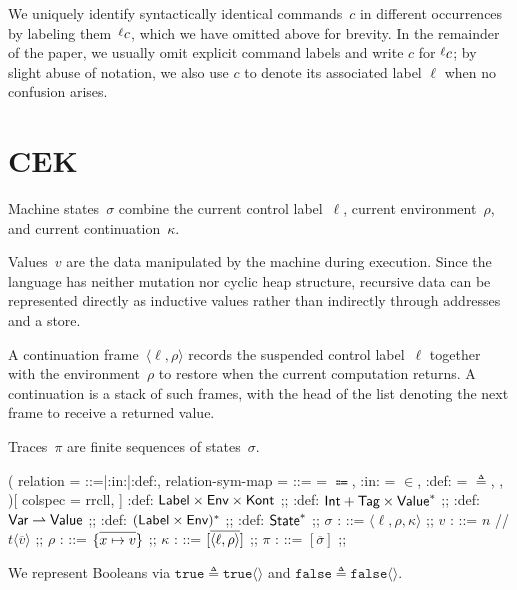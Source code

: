 \documentclass[11pt]{article}
\begin{document}
We uniquely identify syntactically identical commands~$c$ in different occurrences by labeling them~$\lbl{\ell}c$, which we have omitted above for brevity.
In the remainder of the paper, we usually omit explicit command labels and write \(c\) for \(\lbl{\ell}c\); by slight abuse of notation, we also use \(c\) to denote its associated label \(\ell\) when no confusion arises.


\section{CEK}
Machine states~$\sigma$ combine the current control label~$\ell$, current environment~$\rho$, and current continuation~$\kappa.$

Values~$v$ are the data manipulated by the machine during execution.
Since the language has neither mutation nor cyclic heap structure, recursive data can be represented directly as inductive values rather than indirectly through addresses and a store.

A continuation frame~$\langle\ell,\rho\rangle$ records the suspended control label~$\ell$ together with the environment~$\rho$ to restore when the current computation returns.
A continuation is a stack of such frames, with the head of the list denoting the next frame to receive a returned value.

Traces~$\pi$ are finite sequences of states~$\sigma$.
\begin{center}
\begin{bnf}(
  relation = {::=|:in:|:def:},
  relation-sym-map = {
    {::=} = {\ensuremath{\Coloneqq}},
    {:in:} = {\ensuremath{\in}},
    {:def:} = {\ensuremath{\triangleq}},
  },
)[
  colspec = rrcll,
]
  \State :def: $\textsf{Label} \times \textsf{Env} \times \textsf{Kont}$ ;;
  \Val :def: $\textsf{Int} + \textsf{Tag} \times \textsf{Value}^*$ ;;
  \Env :def: $\textsf{Var} \rightharpoonup \textsf{Value}$ ;;
  \Kont :def: $(\textsf{Label} \times \textsf{Env})^*$ ;;
  \Trace :def: $\textsf{State}^*$ ;;
  $\sigma$ : \State ::= $\langle \ell, \rho, \kappa \rangle$ ;;
  $v$ : \Val ::= $n$ // $t\langle\overline{v}\rangle$ ;;
  $\rho$ : \Env ::= $\{\Overline{x \mapsto v }\}$ ;;
  $\kappa$ : \Kont ::= $[\Overline{\langle \ell, \rho \rangle}]$ ;;
  $\pi$ : \Trace ::= $[\overline{\sigma}]$ ;;
\end{bnf}
\end{center}

We represent Booleans via $\texttt{true} \triangleq \texttt{true}\langle\rangle$ and $\texttt{false} \triangleq \texttt{false}\langle\rangle$.
\end{document}
